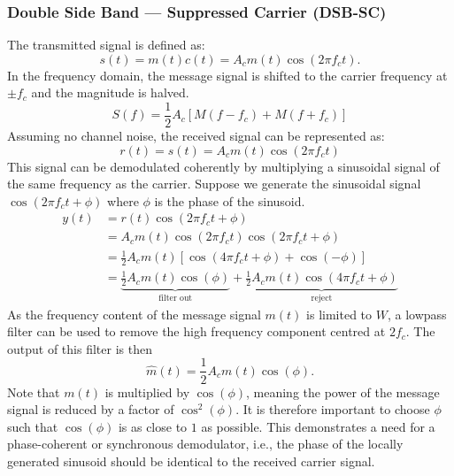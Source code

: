 \documentclass{article}
\begin{document}
\subsubsection{Double Side Band --- Suppressed Carrier (DSB-SC)}
The transmitted signal is defined as:
\begin{equation*}
    s\left( t \right) = m\left( t \right) c\left( t \right) = A_c m\left( t \right) \cos{\left( 2 \pi f_c t \right)}.
\end{equation*}
In the frequency domain, the message signal is shifted to the carrier
frequency at \(\pm f_c\) and the magnitude is halved.
\begin{equation*}
    S\left( f \right) = \frac{1}{2} A_c \left[ M\left( f - f_c \right) + M\left( f + f_c \right) \right]
\end{equation*}
Assuming no channel noise, the received signal can be represented as:
\begin{equation*}
    r\left( t \right) = s\left( t \right) = A_c m\left( t \right) \cos{\left( 2 \pi f_c t \right)}
\end{equation*}
This signal can be demodulated coherently by multiplying a sinusoidal
signal of the same frequency as the carrier. Suppose we generate the
sinusoidal signal \(\cos{\left( 2 \pi f_c t + \phi \right)}\) where
\(\phi\) is the phase of the sinusoid.
\begin{align*}
    y\left( t \right) & = r\left( t \right) \cos{\left( 2 \pi f_c t + \phi \right)}                                                                                                                                             \\
                      & = A_c m\left( t \right) \cos{\left( 2 \pi f_c t \right)} \cos{\left( 2 \pi f_c t + \phi \right)}                                                                                                        \\
                      & = \frac{1}{2} A_c m\left( t \right) \left[ \cos{\left( 4 \pi f_c t + \phi \right)} + \cos{\left( -\phi \right)} \right]                                                                                 \\
                      & = \underbrace{\frac{1}{2} A_c m\left( t \right) \cos{\left( \phi \right)}}_{\text{filter out}} + \underbrace{\frac{1}{2} A_c m\left( t \right) \cos{\left( 4 \pi f_c t + \phi \right)}}_{\text{reject}}
\end{align*}
As the frequency content of the message signal \(m\left( t \right)\) is
limited to \(W\), a lowpass filter can be used to remove the high
frequency component centred at \(2f_c\). The output of this filter is
then
\begin{equation*}
    \hat{m}\left( t \right) = \frac{1}{2} A_c m\left( t \right) \cos{\left( \phi \right)}.
\end{equation*}
Note that \(m\left( t \right)\) is multiplied by \(\cos{\left( \phi
    \right)}\), meaning the power of the message signal is reduced by a
factor of \(\cos^2{\left( \phi \right)}\). It is therefore important to
choose \(\phi\) such that \(\cos{\left( \phi \right)}\) is as close to
\(1\) as possible. This demonstrates a need for a phase-coherent or
synchronous demodulator, i.e., the phase of the locally generated
sinusoid should be identical to the received carrier signal.
\end{document}
